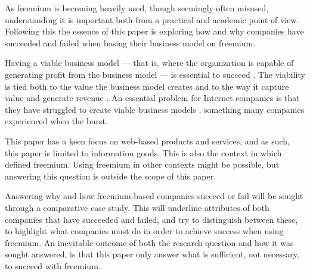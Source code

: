 As freemium is becoming heavily used, though seemingly often misused, understanding it is important both from a practical and academic point of view. Following this the essence of this paper is exploring how and why companies have succeeded and failed when basing their business model on freemium.



Having a viable business model --- that is, where the organization is capable of generating profit from the business model \citep{gordijn2001} --- is essential to succeed \citep{magretta2002}. The viability is tied both to the value the business model creates and to the way it capture value and generate revenue \citep{shafer2005}. An essential problem for Internet companies is that they have struggled to create viable business models \citep{teece2010}, something many companies experienced when the  burst.


This paper has a keen focus on web-based products and services, and as such, this paper is limited to information goods. This is also the context in which \citet{wilson2006} defined freemium. Using freemium in other contexts might be possible, but answering this question is outside the scope of this paper.


Answering why and how freemium-based companies succeed or fail will be sought through a comparative case study. This will underline attributes of both companies that have succeeded and failed, and try to distinguish between these, to highlight what companies must do in order to achieve success when using freemium. An inevitable outcome of both the research question and how it was sought answered, is that this paper only answer what is sufficient, not necessary, to succeed with freemium.

